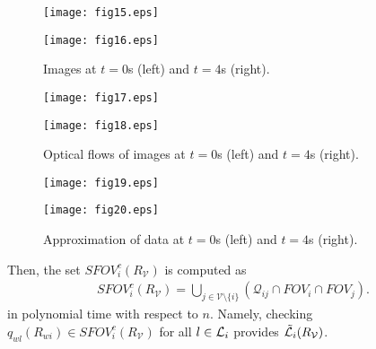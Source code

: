 \documentclass[conference,letterpaper]{ieeeconf}
\newcommand{\V}{{\mathcal V}}
\newcommand{\Q}{{\mathcal Q}}
\newcommand{\ewi}{R_{wi}}
\renewcommand{\L}{{\cal L}}
\begin{document}
\begin{figure}[t]
\begin{center}
\begin{minipage}{4cm}
\begin{center}
\texttt{[image: fig15.eps]}
\end{center}
\end{minipage}
\hspace{.2cm}
\begin{minipage}{4cm}
\begin{center}
\texttt{[image: fig16.eps]}
\end{center}
\end{minipage}
\caption{Images at $t=0$s (left) and $t = 4$s (right).}
\label{fig:initial_image}
\bigskip

\begin{minipage}{4cm}
\begin{center}
\texttt{[image: fig17.eps]}
\end{center}
\end{minipage}
\hspace{.2cm}
\begin{minipage}{4cm}
\begin{center}
\texttt{[image: fig18.eps]}
\end{center}
\end{minipage}
\caption{Optical flows of images at $t=0$s (left) and $t = 4$s (right).}
\label{fig:of_image}
\bigskip

\begin{minipage}{4cm}
\begin{center}
\texttt{[image: fig19.eps]}
\end{center}
\end{minipage}
\hspace{.2cm}
\begin{minipage}{4cm}
\begin{center}
\texttt{[image: fig20.eps]}
\end{center}
\end{minipage}
\caption{Approximation of data at $t=0$s (left) and $t = 4$s (right).}
\label{fig:curve_fit}
\end{center}
\end{figure}



Then, the set $SFOV^c_i(R_{\V})$ is computed as
\begin{eqnarray}
SFOV^c_i(R_{\V}) = \bigcup_{j\in \V\setminus \{i\}} (\Q_{ij} \cap FOV_i \cap FOV_j).
\label{eqn:SFOV_check}
\end{eqnarray}
in polynomial time with respect to $n$.
Namely, checking $q_{wl}(\ewi) \in SFOV^c_i(R_{\V})$
for all $l\in \L_i$
provides  $\tilde \L_i(R_{\V})$.
\end{document}
